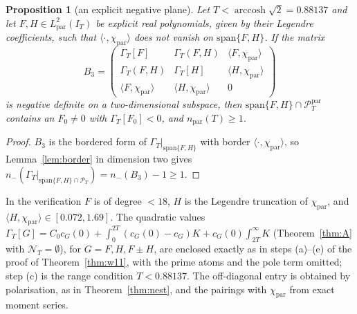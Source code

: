 \documentclass[11pt]{amsart}
\newtheorem{proposition}[theorem]{Proposition}
\theoremstyle{definition}
\theoremstyle{remark}
\newcommand{\PT}{\mathcal P_T}
\newcommand{\IT}{I_T}
\newcommand{\NT}{\mathcal N_T}
\begin{document}
\begin{proposition}[an explicit negative plane]\label{prop:negplane}
Let $T<\operatorname{arccosh}\sqrt2=0.88137$ and let $F,H\in L^2_{\mathrm{par}}(\IT)$ be
explicit real polynomials, given by their Legendre coefficients, such that $\langle\cdot,\chi_{\mathrm{par}}\rangle$
does not vanish on $\mathrm{span}\{F,H\}$. If the matrix
\[
B_3=\begin{pmatrix}\Gamma_T[F]&\Gamma_T(F,H)&\langle F,\chi_{\mathrm{par}}\rangle\\
\Gamma_T(F,H)&\Gamma_T[H]&\langle H,\chi_{\mathrm{par}}\rangle\\
\langle F,\chi_{\mathrm{par}}\rangle&\langle H,\chi_{\mathrm{par}}\rangle&0\end{pmatrix}
\]
is negative definite on a two-dimensional subspace, then $\mathrm{span}\{F,H\}\cap\PT^{\mathrm{par}}$
contains an $F_0\ne0$ with $\Gamma_T[F_0]<0$, and $n_{\mathrm{par}}(T)\ge1$.
\end{proposition}
\begin{proof}
$B_3$ is the bordered form of $\Gamma_T|_{\mathrm{span}\{F,H\}}$ with border $\langle\cdot,\chi_{\mathrm{par}}\rangle$,
so Lemma~\ref{lem:border} in dimension two gives
$n_-(\Gamma_T|_{\mathrm{span}\{F,H\}\cap\PT})=n_-(B_3)-1\ge1$.
\end{proof}
In the verification $F$ is of degree $<18$, $H$ is the Legendre truncation of
$\chi_{\mathrm{par}}$, and $\langle H,\chi_{\mathrm{par}}\rangle\in[0.072,1.69]$. The quadratic values
$\Gamma_T[G]=C_0c_G(0)+\int_0^{2T}(c_G(0)-c_G)K+c_G(0)\int_{2T}^\infty K$ (Theorem~\ref{thm:A} with
$\NT=\emptyset$), for $G=F,H,F\pm H$, are enclosed exactly as in steps (a)--(e) of the proof of
Theorem~\ref{thm:w11}, with the prime atoms and the pole term omitted; step (c) is the range condition
$T<0.88137$. The off-diagonal entry is obtained by polarisation, as in Theorem~\ref{thm:nest}, and the
pairings with $\chi_{\mathrm{par}}$ from exact moment series.
\end{document}
